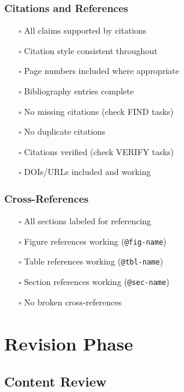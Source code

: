 \documentclass[
  11pt,
  letterpaper,
]{book}
\providecommand{\tightlist}{%
  \setlength{\itemsep}{0pt}\setlength{\parskip}{0pt}}
\begin{document}
\subsubsection*{Citations and
References}\label{citations-and-references-1}

\begin{itemize}
\tightlist
\item[$\square$]
  All claims supported by citations
\item[$\square$]
  Citation style consistent throughout
\item[$\square$]
  Page numbers included where appropriate
\item[$\square$]
  Bibliography entries complete
\item[$\square$]
  No missing citations (check FIND tasks)
\item[$\square$]
  No duplicate citations
\item[$\square$]
  Citations verified (check VERIFY tasks)
\item[$\square$]
  DOIs/URLs included and working
\end{itemize}

\subsubsection*{Cross-References}\label{cross-references-1}

\begin{itemize}
\tightlist
\item[$\square$]
  All sections labeled for referencing
\item[$\square$]
  Figure references working (\texttt{@fig-name})
\item[$\square$]
  Table references working (\texttt{@tbl-name})
\item[$\square$]
  Section references working (\texttt{@sec-name})
\item[$\square$]
  No broken cross-references
\end{itemize}

\section*{Revision Phase}\label{revision-phase}


\subsection*{Content Review}\label{content-review}
\end{document}
